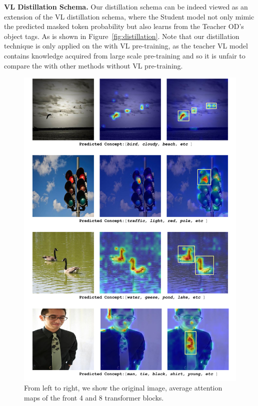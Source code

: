 \vspace{1mm}
\noindent\textbf{VL Distillation Schema.} Our distillation schema can be indeed viewed as an extension of the VL distillation schema, where the Student model not only mimic the predicted masked token probability but also learns from the Teacher OD's object tags. As is shown in Figure~\ref{fig:distillation}. Note that our distillation technique is only applied on the \vitcap with VL pre-training, as the teacher VL model contains knowledge acquired from large scale pre-training and so it is unfair to compare the \vitcap with other methods without VL pre-training.

\begin{figure}[t!]
  \begin{center}
  \includegraphics[width=.75\textwidth]{./images/grounding.pdf}
  \end{center}
  \vspace{-6mm}
    \caption{\small From left to right, we show the original image, average attention maps of the front 4 and 8 transformer blocks.  }
    \vspace{-2mm}
  \label{fig:grounding}
\end{figure}



